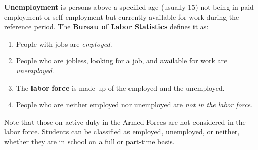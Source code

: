 \documentclass{article}
\begin{document}
    \begin{definition}[Unemployment]
      \label{def:unemployment}
      \textbf{Unemployment} is persons above a specified age (usually 15) not being in paid employment or self-employment but currently available for work during the reference period. The \textbf{Bureau of Labor Statistics} defines it as: 
      \begin{enumerate}
        \item People with jobs are \textit{employed}. 
        \item People who are jobless, looking for a job, and available for work are \textit{unemployed}. 
        \item The \textbf{labor force} is made up of the employed and the unemployed. 
        \item People who are neither employed nor unemployed are \textit{not in the labor force}. 
      \end{enumerate}
      Note that those on active duty in the Armed Forces are not considered in the labor force. Students can be classified as employed, unemployed, or neither, whether they are in school on a full or part-time basis. 
    \end{definition}
\end{document}
